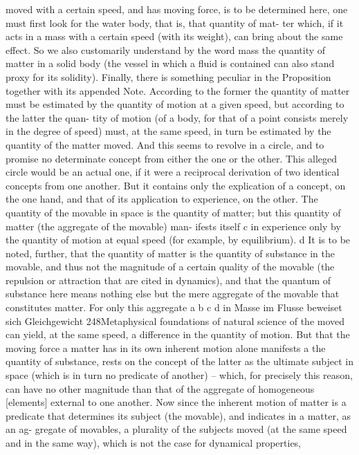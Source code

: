 moved with a certain speed, and has moving force, is to be determined
here, one must ﬁrst look for the water body, that is, that quantity of mat-
ter which, if it acts in a mass with a certain speed (with its weight), can
bring about the same effect. So we also customarily understand by the
word mass the quantity of matter in a solid body (the vessel in which a
ﬂuid is contained can also stand proxy for its solidity). Finally, there is
something peculiar in the Proposition together with its appended Note.
According to the former the quantity of matter must be estimated by the
quantity of motion at a given speed, but according to the latter the quan-
tity of motion (of a body, for that of a point consists merely in the degree
of speed) must, at the same speed, in turn be estimated by the quantity of
the matter moved. And this seems to revolve in a circle, and to promise
no determinate concept from either the one or the other. This alleged
circle would be an actual one, if it were a reciprocal derivation of two
identical concepts from one another. But it contains only the explication
of a concept, on the one hand, and that of its application to experience,
on the other. The quantity of the movable in space is the quantity of
matter; but this quantity of matter (the aggregate of the movable) man-
ifests itself c in experience only by the quantity of motion at equal speed
(for example, by equilibrium). d
It is to be noted, further, that the quantity of matter is the quantity of
substance in the movable, and thus not the magnitude of a certain quality
of the movable (the repulsion or attraction that are cited in dynamics),
and that the quantum of substance here means nothing else but the mere
aggregate of the movable that constitutes matter. For only this aggregate
a
b
c
d
in Masse
im Flusse
beweiset sich
Gleichgewicht
248Metaphysical foundations of natural science
of the moved can yield, at the same speed, a difference in the quantity
of motion. But that the moving force a matter has in its own inherent
motion alone manifests a the quantity of substance, rests on the concept of
the latter as the ultimate subject in space (which is in turn no predicate of
another) – which, for precisely this reason, can have no other magnitude
than that of the aggregate of homogeneous [elements] external to one
another. Now since the inherent motion of matter is a predicate that
determines its subject (the movable), and indicates in a matter, as an ag-
gregate of movables, a plurality of the subjects moved (at the same speed
and in the same way), which is not the case for dynamical properties,
